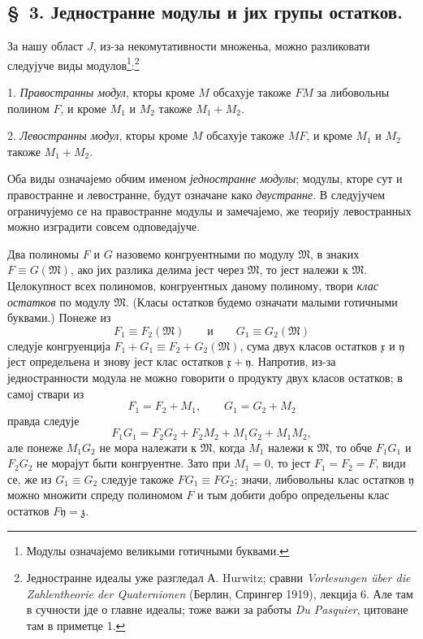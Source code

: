 ﻿\documentclass[11pt]{article}
\providecommand{\mM}{\mathfrak M}
\providecommand{\mx}{\mathfrak x}
\providecommand{\my}{\mathfrak y}
\providecommand{\mz}{\mathfrak z}
\begin{document}

\setcounter{footnote}{8}
\subsection*{\S~3. Једностранне модулы и јих групы остатков.}

За нашу област \(J\), из-за некомутативности множеньа, можно разликовати следујуче виды модулов\footnote{Модулы означајемо великыми готичными буквами.}:\footnote{Једностранне идеалы уже разгледал А. Hurwitz; сравни \emph{Vorlesungen über die Zahlentheorie der Quaternionen} (Берлин, Спрингер 1919), лекција 6. Але там в сучности јде о главне идеалы; тоже важи за работы \emph{Du Pasquier}, цитоване там в приметце 1.}

1. \textit{Правостранны модул}, кторы кроме \(M\) обсахује такоже \(FM\) за либовольны полином \(F\), и кроме \(M_1\) и \(M_2\) такоже \(M_1+M_2\).

2. \textit{Левостранны модул}, кторы кроме \(M\) обсахује такоже \(MF\), и кроме \(M_1\) и \(M_2\) такоже \(M_1+M_2\).

Оба виды означајемо обчим именом \textit{једностранне модулы}; модулы, кторе сут и правостранне и левостранне, будут означане како \textit{двустранне}. В следујучем ограничујемо се на правостранне модулы и замечајемо, же теорију левостранных можно изградити совсем одповедајуче.

Два полиномы \(F\) и \(G\) назовемо конгруентными по модулу \(\mM\), в знаких \(F\equiv G(\mM)\), ако јих разлика делима јест через \(\mM\), то јест належи к \(\mM\). Целокупност всех полиномов, конгруентных даному полиному, твори \textit{клас остатков} по модулу \(\mM\). (Класы остатков будемо означати малыми готичными буквами.) Понеже из
\[
 F_1\equiv F_2(\mM)\qquad\text{и}\qquad G_1\equiv G_2(\mM)
\]
следује конгруенција \(F_1+G_1\equiv F_2+G_2(\mM)\), сума двух класов остатков \(\mx\) и \(\my\) јест определьена и знову јест клас остатков \(\mx+\my\). Напротив, из-за једностранности модула не можно говорити о продукту двух класов остатков; в самој ствари из
\[
 F_1=F_2+M_1,\qquad G_1=G_2+M_2
\]
правда следује
\[
 F_1G_1=F_2G_2+F_2M_2+M_1G_2+M_1M_2,
\]
але понеже \(M_1G_2\) не мора належати к \(\mM\), когда \(M_1\) належи к \(\mM\), то обче \(F_1G_1\) и \(F_2G_2\) не морајут быти конгруентне. Зато при \(M_1=0\), то јест \(F_1=F_2=F\), види се, же из \(G_1\equiv G_2\) следује такоже \(FG_1\equiv FG_2\); значи, либовольны клас остатков \(\my\) можно множити спреду полиномом \(F\) и тым добити добро определьены клас остатков \(F\my=\mz\).
\end{document}
